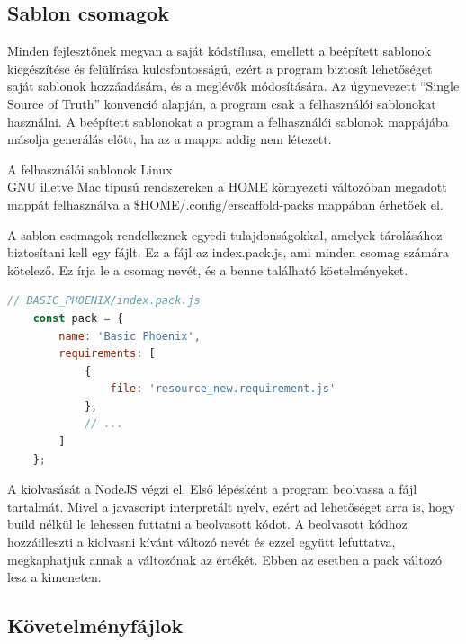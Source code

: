 \documentclass[a4paper,12pt,oneside]{report}
\begin{document}
\newpage
\subsection{Sablon csomagok}

\begin{justify}

	Minden fejlesztőnek megvan a saját kódstílusa, emellett a beépített sablonok kiegészítése és felülírása kulcsfontosságú, ezért a program biztosít lehetőséget saját sablonok hozzáadására, és a meglévők módosítására. Az úgynevezett “Single Source of Truth” konvenció alapján, a program csak a felhasználói sablonokat használni. A beépített sablonokat a program a felhasználói sablonok mappájába másolja generálás előtt, ha az a mappa addig nem létezett.

	A felhasználói sablonok Linux\\GNU illetve Mac típusú rendszereken a HOME környezeti változóban megadott mappát felhasználva a \$HOME/.config/erscaffold-packs mappában érhetőek el. 

	A sablon csomagok rendelkeznek egyedi tulajdonságokkal, amelyek tárolásához biztosítani kell egy fájlt. Ez a fájl az index.pack.js, ami minden csomag számára kötelező. Ez írja le a csomag nevét, és a benne található köetelményeket.

	\begin{lstlisting}[language=javascript]
	// BASIC_PHOENIX/index.pack.js
	const pack = {
		name: 'Basic Phoenix',
		requirements: [
			{
				file: 'resource_new.requirement.js'
			},
			// ...
		]
	};
	\end{lstlisting}

	A kiolvasását a NodeJS végzi el. Első lépésként a program beolvassa a fájl tartalmát. Mivel a javascript interpretált nyelv, ezért ad lehetőséget arra is, hogy build nélkül le lehessen futtatni a beolvasott kódot. A beolvasott kódhoz hozzáilleszti a kiolvasni kívánt változó nevét és ezzel együtt lefuttatva, megkaphatjuk annak a változónak az értékét. Ebben az esetben a pack változó lesz a kimeneten.  

\end{justify}

\newpage
\subsection{Követelményfájlok}
\end{document}
